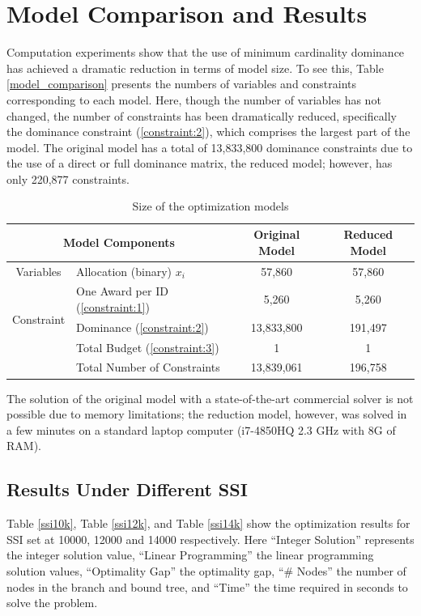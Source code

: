 \documentclass[12pt,english]{report}
\begin{document}
\section{Model Comparison and Results}
Computation experiments show that the use of minimum cardinality dominance has achieved a dramatic reduction in terms of model size.  To see this, Table \ref{model_comparison} presents the numbers of variables and constraints corresponding to each model. Here, though the number of variables has not changed, the number of constraints has been dramatically reduced, specifically the dominance constraint (\ref{constraint:2}), which comprises the largest part of the model. The original model has a total of 13,833,800 dominance constraints due to the use of a direct or full dominance matrix, the reduced model; however, has only 220,877 constraints.

\begin{table}[H]
\centering
\begin{tabular}{|c|l|c|c|}
\hline %
\multicolumn{2}{|c|}{Model Components}     &
Original Model & Reduced Model \\ \hline
Variables                   & \multicolumn{1}{|l|}{Allocation (binary)  $x_i$}
& 57,860         & 57,860        \\ \hline
\multirow{3}{*}{Constraint} & One Award per ID  (\ref{constraint:1})        &
5,260          & 5,260         \\ \cline{2-4}
& Dominance  (\ref{constraint:2})    & 13,833,800   & 191,497
\\ \cline{2-4}
& Total Budget   (\ref{constraint:3})   & 1       & 1
\\ \cline{2-4}
& Total Number of Constraints                   & 13,839,061     & 196,758
\\ \hline
\end{tabular}
\caption{Size of the optimization models }
\label{model_comparison}
\label{size_model}
\end{table}

The solution of the original model with a state-of-the-art commercial solver is not possible due to memory limitations; the reduction model, however,  was solved in a few minutes on a standard laptop computer (i7-4850HQ 2.3 GHz with 8G of RAM).

\subsection{Results Under Different SSI}
Table \ref{ssi10k}, Table \ref{ssi12k}, and Table \ref{ssi14k} show the optimization results for SSI set at 10000, 12000 and 14000 respectively.  Here  ``Integer Solution'' represents the integer solution value,  ``Linear Programming'' the linear programming solution values, ``Optimality Gap'' the optimality gap,  ``\# Nodes'' the number of nodes in the branch and bound tree,  and ``Time'' the time required in seconds to solve the problem. 
\end{document}
